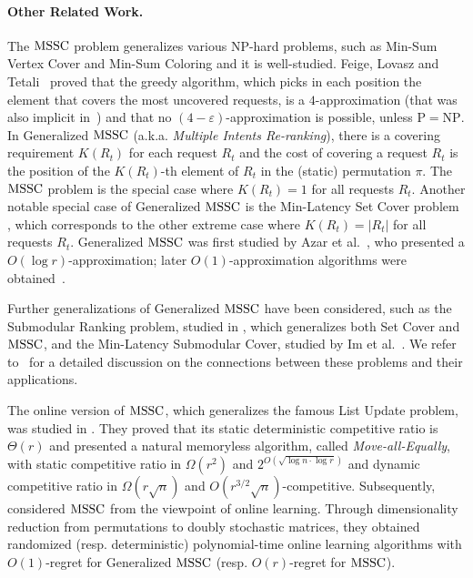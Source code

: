 \paragraph{Other Related Work.}
%
The $\mathrm{MSSC}$ problem generalizes various $\mathrm{NP}$-hard problems, such as Min-Sum Vertex Cover and Min-Sum Coloring and it is well-studied. Feige, Lovasz and Tetali~\cite{FLT04} proved that the greedy algorithm, which picks in each position the element that covers the most uncovered requests, is a $4$-approximation (that was also implicit in~\cite{BBHST98}) and that no $(4-\varepsilon)$-approximation is possible, unless $\mathrm{P} = \mathrm{NP}$. In Generalized $\mathrm{MSSC}$ (a.k.a. \emph{Multiple Intents Re-ranking}), there is a covering requirement $K(R_t)$ for each request $R_t$ and the cost of covering a request $R_t$ is the position of the $K(R_t)$-th element of $R_t$ in the (static) permutation $\pi$. The $\mathrm{MSSC}$ problem is the special case where $K(R_t)=1$ for all requests $R_t$. Another notable special case of Generalized $\mathrm{MSSC}$ is the Min-Latency Set Cover problem \cite{HL05}, which corresponds to the other extreme case where $K(R_t) = |R_t|$ for all requests $R_t$. Generalized $\mathrm{MSSC}$ was first studied by Azar et al.~\cite{AGY09}, who presented a $O(\log r)$-approximation; later $O(1)$-approximation algorithms were obtained~\cite{BGK10,SW11,ISZ14,BBFT20}.

Further generalizations of Generalized $\mathrm{MSSC}$ have been considered, such as the Submodular Ranking problem, studied in \cite{AG11}, which generalizes both Set Cover and $\mathrm{MSSC}$, and the Min-Latency Submodular Cover, studied by Im et al.~\cite{INZ16}. We refer to~\cite{INZ16,Im16} for a detailed discussion on the connections between these problems and their applications. 

The online version of $\mathrm{MSSC}$, which generalizes the famous List Update problem, was studied in \cite{FKKSV20}. They proved that its static deterministic competitive ratio is $\Theta(r)$ and presented a natural  memoryless algorithm, called \emph{Move-all-Equally}, with static competitive ratio in $\Omega(r^2)$ and $2^{O(\sqrt{\log n  \cdot \log r})}$ and dynamic competitive ratio in $\Omega(r \sqrt{n})$ and $O(r^{3/2} \sqrt{n})$-competitive. Subsequently, \cite{FLPS20} considered $\mathrm{MSSC}$ from the viewpoint of online learning. Through dimensionality reduction from permutations to doubly stochastic matrices, they obtained randomized (resp. deterministic) polynomial-time online learning algorithms with $O(1)$-regret for Generalized $\mathrm{MSSC}$ (resp. $O(r)$-regret for $\mathrm{MSSC}$). 

